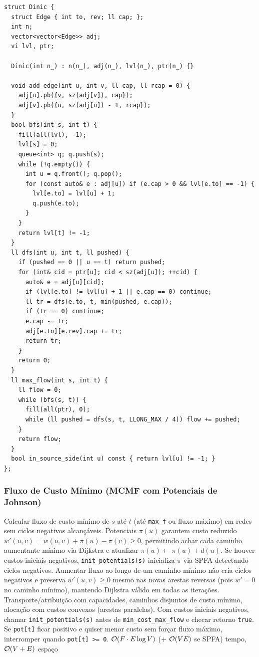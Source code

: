 \begin{lstlisting}
struct Dinic {
  struct Edge { int to, rev; ll cap; };
  int n;
  vector<vector<Edge>> adj;
  vi lvl, ptr;

  Dinic(int n_) : n(n_), adj(n_), lvl(n_), ptr(n_) {}

  void add_edge(int u, int v, ll cap, ll rcap = 0) {
    adj[u].pb({v, sz(adj[v]), cap});
    adj[v].pb({u, sz(adj[u]) - 1, rcap});
  }
  bool bfs(int s, int t) {
    fill(all(lvl), -1);
    lvl[s] = 0;
    queue<int> q; q.push(s);
    while (!q.empty()) {
      int u = q.front(); q.pop();
      for (const auto& e : adj[u]) if (e.cap > 0 && lvl[e.to] == -1) {
        lvl[e.to] = lvl[u] + 1;
        q.push(e.to);
      }
    }
    return lvl[t] != -1;
  }
  ll dfs(int u, int t, ll pushed) {
    if (pushed == 0 || u == t) return pushed;
    for (int& cid = ptr[u]; cid < sz(adj[u]); ++cid) {
      auto& e = adj[u][cid];
      if (lvl[e.to] != lvl[u] + 1 || e.cap == 0) continue;
      ll tr = dfs(e.to, t, min(pushed, e.cap));
      if (tr == 0) continue;
      e.cap -= tr;
      adj[e.to][e.rev].cap += tr;
      return tr;
    }
    return 0;
  }
  ll max_flow(int s, int t) {
    ll flow = 0;
    while (bfs(s, t)) {
      fill(all(ptr), 0);
      while (ll pushed = dfs(s, t, LLONG_MAX / 4)) flow += pushed;
    }
    return flow;
  }
  bool in_source_side(int u) const { return lvl[u] != -1; }
};
\end{lstlisting}

\subsubsection{Fluxo de Custo Mínimo (MCMF com Potenciais de Johnson)}
\algobox
  {Calcular fluxo de custo mínimo de $s$ até $t$ (até \texttt{max\_f} ou fluxo máximo) em redes sem ciclos negativos alcançáveis.}
  {Potenciais $\pi(u)$ garantem custo reduzido $w'(u, v) = w(u, v) + \pi(u) - \pi(v) \ge 0$, permitindo achar cada caminho aumentante mínimo via Dijkstra e atualizar $\pi(u) \leftarrow \pi(u) + d(u)$. Se houver custos iniciais negativos, \texttt{init\_potentials(s)} inicializa $\pi$ via SPFA detectando ciclos negativos.}
  {Aumentar fluxo ao longo de um caminho mínimo não cria ciclos negativos e preserva $w'(u, v) \ge 0$ mesmo nas novas arestas reversas (pois $w' = 0$ no caminho mínimo), mantendo Dijkstra válido em todas as iterações.}
  {Transporte/atribuição com capacidades, caminhos disjuntos de custo mínimo, alocação com custos convexos (arestas paralelas).}
  {Com custos iniciais negativos, chamar \texttt{init\_potentials(s)} antes de \texttt{min\_cost\_max\_flow} e checar retorno \texttt{true}. Se \texttt{pot[t]} ficar positivo e quiser menor custo sem forçar fluxo máximo, interromper quando \texttt{pot[t] >= 0}.}
  {$\mathcal{O}(F \cdot E \log V)$ (+ $\mathcal{O}(VE)$ se SPFA) tempo, $\mathcal{O}(V + E)$ espaço}

